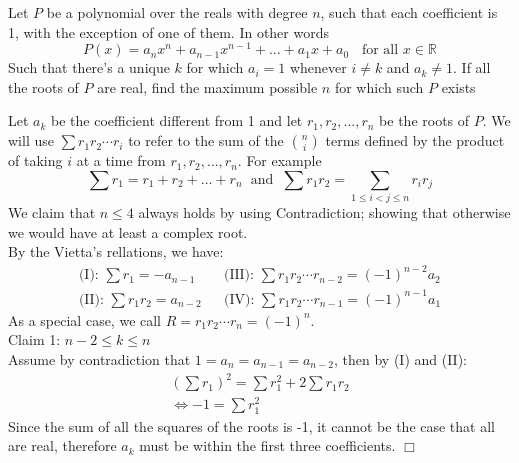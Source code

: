 \begin{problem}
    Let $P$ be a polynomial over the reals with degree $n$, such that each coefficient is 1, with the exception of one of them. In other words 
    $$ P(x) = a_nx^n + a_{n-1}x^{n-1} + \ldots + a_1x + a_0 \hspace{7pt} \text{ for all } x \in \mathbb{R}$$
    Such that there's a unique $k$ for which $a_i = 1$ whenever $i \neq k$ and $a_k \neq 1$. If all the roots of $P$ are real, find the maximum possible $n$ for which such $P$ exists
\end{problem}

\begin{solution}[$n=4$]
    Let $a_k$ be the coefficient different from 1 and let $r_1, r_2, \ldots , r_n$ be the roots of $P$. We will use $\sum r_{1} r_2 \cdots r_i$ to refer to the sum of the $\binom{n}{i}$ terms defined by the product of taking $i$ at a time from $r_1, r_2, \ldots, r_n$. For example 
    $$\sum r_1 = r_1+r_2 + \ldots + r_n  \hspace{7pt} \text{and} \hspace{7pt} \sum r_1r_2 = \sum_{1 \leq i < j \leq n} r_ir_j$$
    We claim that $n \leq 4$ always holds by using Contradiction; showing that otherwise we would have at least a complex root.  \\[3mm]
    By the Vietta's rellations, we have:
    \begin{align*}
        \text{(I): } \sum r_1 = -a_{n-1} && \text{(III): } \sum r_1 r_2 \cdots r_{n-2} = (-1)^{n-2} a_2 \\
        \text{(II): } \sum r_1r_2 = a_{n-2} && \text{(IV): }\sum r_1 r_2 \cdots r_{n-1} = (-1)^{n-1} a_1
    \end{align*}
    As a special case, we call $R = r_1r_2 \cdots r_n = (-1)^n$. \\[1.5mm]
    Claim 1: $n-2 \leq k \leq n$ \\[1.2mm]
        Assume by contradiction that $1 = a_n = a_{n-1} = a_{n-2}$, then by (I) and (II):
        \begin{align*}
            \left ( \sum r_1 \right )^2 = \sum r_1^2 + 2 \sum r_1 r_2 \\
            \iff -1 = \sum r_1^2 
        \end{align*}
        Since the sum of all the squares of the roots is -1, it cannot be the case that all are real, therefore $a_k$ must be within the first three coefficients. $\Box$ \\[2mm]

\end{solution}
